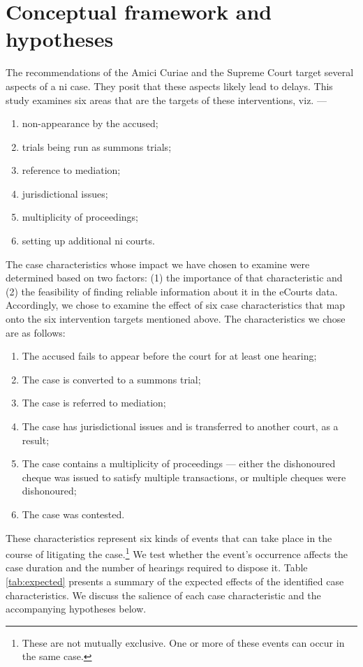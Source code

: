 \documentclass[12pt,a4paper]{article}
\begin{document}
\section{Conceptual framework and hypotheses}
\label{sec:select-case-char}

The recommendations of the Amici Curiae and the Supreme Court target several aspects of a \gls{ni} case. They posit that these aspects likely lead to delays. This study examines six areas that are the targets of these interventions, viz. ---

\begin{enumerate}
\item non-appearance by the accused;
\item trials being run as summons trials;
\item reference to mediation;
\item jurisdictional issues;
\item multiplicity of proceedings;
\item setting up additional \gls{ni} courts.
\end{enumerate}

The case characteristics whose impact we have chosen to examine were determined based on two factors: (1) the importance of that characteristic and (2) the feasibility of finding reliable information about it in the eCourts data. Accordingly, we chose to examine the effect of six case characteristics that map onto the six intervention targets mentioned above. The characteristics we chose are as follows:
\begin{enumerate}
\item The accused fails to appear before the court for at least one hearing;
\item The case is converted to a summons trial;
\item The case is referred to mediation;
\item The case has jurisdictional issues and is transferred to another court, as a result;
\item The case contains a multiplicity of proceedings --- either the dishonoured cheque was issued to satisfy multiple transactions, or multiple cheques were dishonoured;
\item The case was contested.
\end{enumerate}

These characteristics represent six kinds of events that can take place in the course of litigating the case.\footnote{These are not mutually exclusive. One or more of these events can occur in the same case.} We test whether the event's occurrence affects the case duration and the number of hearings required to dispose it. Table \ref{tab:expected} presents a summary of the expected effects of the identified case characteristics. We discuss the salience of each case characteristic and the accompanying hypotheses below.
\end{document}
